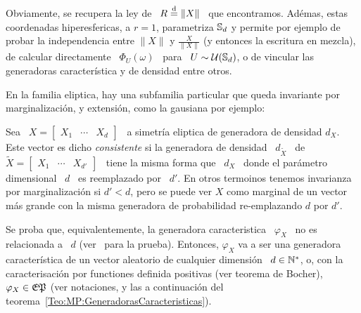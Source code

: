%
Obviamente,   se   recupera   la   ley   de   \   $R   \stackrel{\mathrm{d}}{=}   \|X\|$   \   que
encontramos.  Ad\'emas, estas coordenadas  hiperesfericas, a  $r=1$, parametriza
$\mathbb{S}_d$  y permite  por ejemplo  de probar  la independencia  entre  $\|X\|$ y
$\frac{X}{\|X\|}$ (y entonces la  escritura en mezcla), de calcular directamente
\ $\Phi_U(\omega)$ \ para \ $U  \sim \mathcal{U}(\mathbb{S}_d)$, o de vincular las generadoras
caracter\'istica y de densidad entre otros.

En la familia  eliptica, hay una subfamilia particular  que queda invariante por
marginalizaci\'on, y extensi\'on, como la gausiana por ejemplo:
%
\begin{definicion}
%
  Sea \  $X = \begin{bmatrix} X_1 &  \cdots & X_d \end{bmatrix}$  \ a simetr\'ia
  eliptica  de  generadora  de  densidad  $d_X$.   Este  vector  es  dicho  {\em
    consistente}  si  la  generadora  de  densidad \  $d_{\widetilde{X}}$  \  de
  $\widetilde{X} = \begin{bmatrix} X_1 &  \cdots & X_{d'} \end{bmatrix}$ \ tiene
  la misma  forma que  \ $d_X$  \ donde el  par\'ametro dimensional  \ $d$  \ es
  reemplazado   por  \  $d'$.   En  otros   termoinos  tenemos   invarianza  por
  marginalizaci\'on  si $d' <  d$, pero  se puede  ver $X$  como marginal  de un
  vector m\'as grande con la  misma generadora de probabilidad re-emplazando $d$
  por $d'$.

  Se proba  que, equivalentemente, la generadora caracteristica  \ $\varphi_X$ \
  no  es  relacionada a  \  $d$  (ver~\cite{Kan94,  FanKot90} para  la  prueba).
  Entonces, $\varphi_X$  va a ser  una generadora caracter\'istica de  un vector
  aleatorio   de  cualquier   dimensi\'on  \   $d  \in   \mathbb{N}^*$,  o,   con  la
  caracterisaci\'on por functiones definida positivas (ver teorema de Bocher), \
  $\varphi_X   \in  \mathfrak{EP}$  (ver   notaciones,  y   las  a   continuaci\'on  del
  teorema~\ref{Teo:MP:GeneradorasCaracteristicas}).
\end{definicion}


